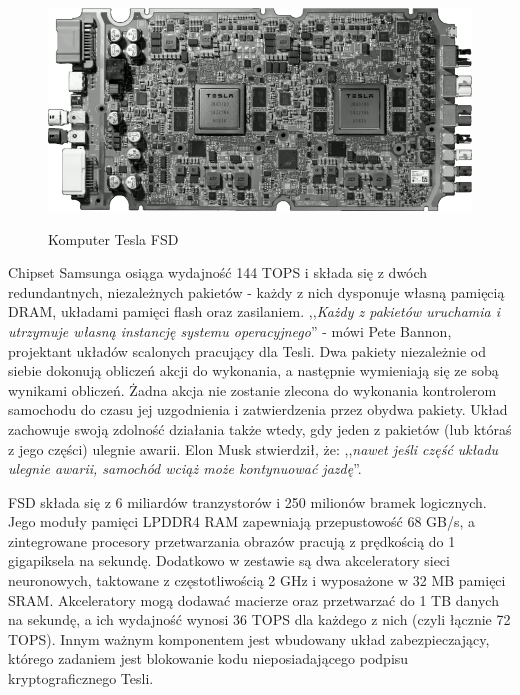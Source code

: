 \begin{figure}[h]
\begin{center}
\includegraphics[width=13.5cm]{resources/figures/tesla_fsd.png}
\caption{Komputer Tesla FSD}
\label{TeslaFsdHardware}
\end{center}
\vspace{-1cm}
\end{figure}

Chipset Samsunga osiąga wydajność 144 TOPS i składa się z dwóch redundantnych, niezależnych pakietów - każdy z nich dysponuje własną pamięcią DRAM, układami pamięci flash oraz zasilaniem. ,,\textit{Każdy z pakietów uruchamia i utrzymuje własną instancję systemu operacyjnego}'' - mówi Pete Bannon, projektant układów scalonych pracujący dla Tesli. Dwa pakiety niezależnie od siebie dokonują obliczeń akcji do wykonania, a następnie wymieniają się ze sobą wynikami obliczeń. Żadna akcja nie zostanie zlecona do wykonania kontrolerom samochodu do czasu jej uzgodnienia i zatwierdzenia przez obydwa pakiety. Układ zachowuje swoją zdolność działania także wtedy, gdy jeden z pakietów (lub któraś z jego części) ulegnie awarii. Elon Musk stwierdził, że: ,,\textit{nawet jeśli część układu ulegnie awarii, samochód wciąż może kontynuować jazdę}''.

FSD składa się z 6 miliardów tranzystorów i 250 milionów bramek logicznych. Jego moduły pamięci LPDDR4 RAM zapewniają przepustowość 68 GB/s, a zintegrowane procesory przetwarzania obrazów pracują z prędkością do 1 gigapiksela na sekundę. Dodatkowo w zestawie są dwa akceleratory sieci neuronowych, taktowane z częstotliwością 2 GHz i wyposażone w 32 MB pamięci SRAM. Akceleratory mogą dodawać macierze oraz przetwarzać do 1 TB danych na sekundę, a ich wydajność wynosi 36 TOPS dla każdego z nich (czyli łącznie 72 TOPS). Innym ważnym komponentem jest wbudowany układ zabezpieczający, którego zadaniem jest blokowanie kodu nieposiadającego podpisu kryptograficznego Tesli.

